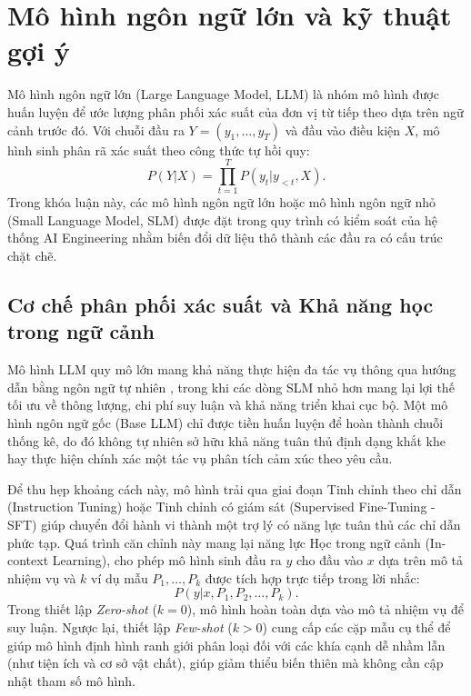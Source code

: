 \section{Mô hình ngôn ngữ lớn và kỹ thuật gợi ý}
\label{sec:dev-chap2-llm-prompt}

Mô hình ngôn ngữ lớn (Large Language Model, LLM) là nhóm mô hình được huấn luyện để ước lượng phân phối xác suất của đơn vị từ tiếp theo dựa trên ngữ cảnh trước đó. Với chuỗi đầu ra $Y=(y_1,\ldots,y_T)$ và đầu vào điều kiện $X$, mô hình sinh phân rã xác suất theo công thức tự hồi quy:
\begin{equation}
P(Y|X)=\prod_{t=1}^{T}P(y_t|y_{<t},X).
\label{eq:dev-chap2-llm-generation}
\end{equation}
Trong khóa luận này, các mô hình ngôn ngữ lớn hoặc mô hình ngôn ngữ nhỏ (Small Language Model, SLM) được đặt trong quy trình có kiểm soát của hệ thống AI Engineering nhằm biến đổi dữ liệu thô thành các đầu ra có cấu trúc chặt chẽ.

\subsection{Cơ chế phân phối xác suất và Khả năng học trong ngữ cảnh}
\label{subsec:dev-chap2-llm-core}

Mô hình LLM quy mô lớn mang khả năng thực hiện đa tác vụ thông qua hướng dẫn bằng ngôn ngữ tự nhiên \cite{brown2020language}, trong khi các dòng SLM nhỏ hơn mang lại lợi thế tối ưu về thông lượng, chi phí suy luận và khả năng triển khai cục bộ. Một mô hình ngôn ngữ gốc (Base LLM) chỉ được tiền huấn luyện để hoàn thành chuỗi thống kê, do đó không tự nhiên sở hữu khả năng tuân thủ định dạng khắt khe hay thực hiện chính xác một tác vụ phân tích cảm xúc theo yêu cầu.

Để thu hẹp khoảng cách này, mô hình trải qua giai đoạn Tinh chỉnh theo chỉ dẫn (Instruction Tuning) hoặc Tinh chỉnh có giám sát (Supervised Fine-Tuning - SFT) giúp chuyển đổi hành vi thành một trợ lý có năng lực tuân thủ các chỉ dẫn phức tạp. Quá trình căn chỉnh này mang lại năng lực Học trong ngữ cảnh (In-context Learning), cho phép mô hình sinh đầu ra $y$ cho đầu vào $x$ dựa trên mô tả nhiệm vụ và $k$ ví dụ mẫu $P_1,\ldots,P_k$ được tích hợp trực tiếp trong lời nhắc:
\begin{equation}
P(y|x,P_1,P_2,\ldots,P_k).
\label{eq:dev-chap2-icl}
\end{equation}
Trong thiết lập \textit{Zero-shot} ($k=0$), mô hình hoàn toàn dựa vào mô tả nhiệm vụ để suy luận. Ngược lại, thiết lập \textit{Few-shot} ($k>0$) cung cấp các cặp mẫu cụ thể để giúp mô hình định hình ranh giới phân loại đối với các khía cạnh dễ nhầm lẫn (như tiện ích và cơ sở vật chất), giúp giảm thiểu biến thiên mà không cần cập nhật tham số mô hình.

